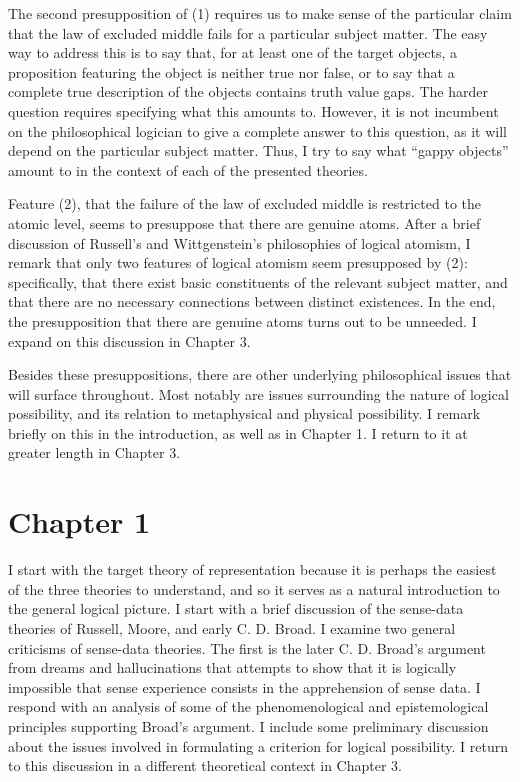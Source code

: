 \documentclass[12pt]{article}
\begin{document}
The second presupposition of (1) requires us to make sense of the particular claim that  the law of excluded middle fails for a particular subject matter. The easy way to address this is to say that, for at least one of the target objects, a proposition featuring the object is neither true nor false, or to say that a complete true description of the objects contains truth value gaps. The harder question requires specifying what this amounts to. However, it is not incumbent on the philosophical logician to give a complete answer to this question, as it will depend on the particular subject matter. Thus, I try to say what ``gappy objects'' amount to in the context of each of the presented theories.

Feature (2), that the failure of the law of excluded middle is restricted to the atomic level, seems to presuppose that there are genuine atoms. After a brief discussion of Russell's and Wittgenstein's philosophies of logical atomism, I remark that only two features of logical atomism seem presupposed by (2): specifically, that there exist basic constituents of the relevant subject matter, and that there are no necessary connections between distinct existences. In the end, the presupposition that there are genuine atoms turns out to be unneeded. I expand on this discussion in Chapter 3.

Besides these presuppositions, there are other underlying philosophical issues that will surface throughout. Most notably are issues surrounding the nature of logical possibility, and its relation to metaphysical and physical possibility. I remark briefly on this in the introduction, as well as in Chapter 1. I return to it at greater length in Chapter 3.
\section*{Chapter 1}
I start with the target theory of representation because it is perhaps the easiest of the three theories to understand, and so it serves as a natural introduction to the general logical picture. I start with a brief discussion of the sense-data theories of Russell, Moore, and early C. D. Broad. I examine two general criticisms of sense-data theories. The first is the later C. D. Broad's argument from dreams and hallucinations that attempts to show that it is logically impossible that sense experience consists in the apprehension of sense data. I respond with an analysis of some of the phenomenological and epistemological principles supporting Broad's argument. I include some preliminary discussion about the issues involved in formulating a criterion for logical possibility. I return to this discussion in a different theoretical context in Chapter 3.
\end{document}
